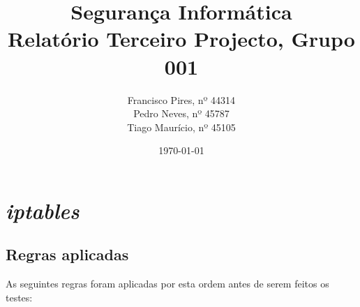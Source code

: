 \documentclass[12pt, a4paper, twoside]{report} %
\begin{document}
\title{%
	\textbf{Segurança Informática}\\ 
	\large Relatório Terceiro Projecto, Grupo 001
}

\author{%
Francisco Pires, nº 44314 \\
Pedro Neves, nº 45787 \\
Tiago Maurício, nº 45105 \\
}

\date{\today}
\maketitle

\chapter{\textit{iptables}}

\section{Regras aplicadas}

As seguintes regras foram aplicadas por esta ordem antes de serem feitos os testes:
\end{document}
